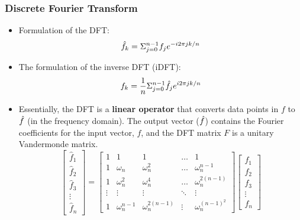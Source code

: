 \documentclass[11.5pt,a4paper]{article}
\begin{document}
\subsubsection*{Discrete Fourier Transform}
\begin{itemize}
    \item Formulation of the DFT:
    \begin{equation*}
        \Hat{f}_k = \Sigma^{n-1}_{j=0} f_je^{-i2\pi jk/n}
    \end{equation*}
    \item The formulation of the inverse DFT (iDFT):
    \begin{equation*}
        f_k = \frac{1}{n}\Sigma^{n-1}_{j=0}\Hat{f}_je^{i2\pi jk/n}
    \end{equation*}
    \item Essentially, the DFT is a \textbf{linear operator} that converts data points in $f$ to $\Hat{f}$ (in the frequency domain). The output vector ($\Hat{f}$) contains the Fourier coefficients for the input vector, $f$, and the DFT matrix $F$ is a unitary Vandermonde matrix.
    \begin{equation*}
        \begin{bmatrix}
            \hat{f}_1 \\
            \hat{f}_2 \\
            \hat{f}_3 \\
            \vdots \\
            \hat{f}_n
        \end{bmatrix} = 
        \begin{bmatrix}
            1 & 1 & 1 & \hdots & 1 \\
            1 & \omega_n & \omega_n^2 & \hdots & \omega_n^{n-1} \\
            1 & \omega_n^2 & \omega_n^4 & \hdots & \omega_n^{2(n-1)} \\
            \vdots & \vdots & \vdots & \ddots & \vdots \\
            1 & \omega_n^{n-1} & \omega_n^{2(n-1)} & \vdots & \omega_n^{(n-1)^2}
        \end{bmatrix} 
        \begin{bmatrix}
            f_1 \\
            f_2 \\
            f_3 \\
            \vdots \\
            f_n
        \end{bmatrix}
    \end{equation*}

\end{itemize}
\end{document}
